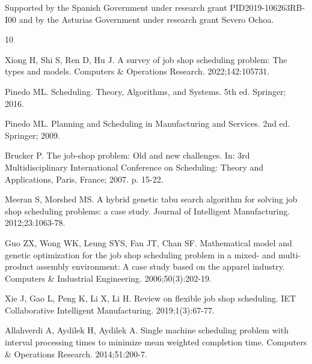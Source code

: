 \documentclass[icae]{iosart2x}
\begin{document}
\begin{acks}
Supported by the Spanish Government under research grant PID2019-106263RB-I00 and by the Asturias Government under research grant Severo Ochoa.
\end{acks}
\begin{thebibliography}{10}

Xiong H, Shi S, Ren D, Hu J.
\newblock A survey of job shop scheduling problem: The types and models.
\newblock Computers \& Operations Research. 2022;142:105731.

Pinedo ML.
\newblock Scheduling. Theory, Algorithms, and Systems.
\newblock 5th ed. Springer; 2016.

Pinedo ML.
\newblock Planning and Scheduling in Manufacturing and Services.
\newblock 2nd ed. Springer; 2009.

Brucker P.
\newblock The job-shop problem: Old and new challenges.
\newblock In: 3rd Multidisciplinary International Conference on Scheduling:
  Theory and Applications, Paris, France; 2007. p. 15-22.

Meeran S, Morshed MS.
\newblock A hybrid genetic tabu search algorithm for solving job shop
  scheduling problems: a case study.
\newblock Journal of Intelligent Manufacturing. 2012;23:1063-78.

Guo ZX, Wong WK, Leung SYS, Fan JT, Chan SF.
\newblock Mathematical model and genetic optimization for the job shop
  scheduling problem in a mixed- and multi-product assembly environment: A case
  study based on the apparel industry.
\newblock Computers \& Industrial Engineering. 2006;50(3):202-19.

Xie J, Gao L, Peng K, Li X, Li H.
\newblock Review on flexible job shop scheduling.
\newblock IET Collaborative Intelligent Manufacturing. 2019;1(3):67-77.

Allahverdi A, Aydilek H, Aydilek A.
\newblock Single machine scheduling problem with interval processing times to
  minimize mean weighted completion time.
\newblock Computers \& Operations Research. 2014;51:200-7.


\end{thebibliography}
\end{document}
